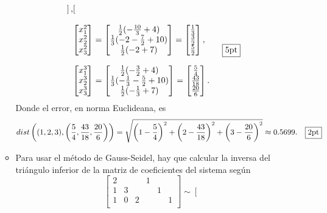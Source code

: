 \documentclass[11pt]{article}
\begin{document}
\begin{enumerate}
\begin{itemize}
$$\begin{array}{l}
\begin{bmatrix}
\end{bmatrix},\\ \\
\begin{bmatrix}
x_1^{2}\\x_2^{2}\\x_3^{2}
\end{bmatrix}
=
\begin{bmatrix}
\frac{1}{2}(-\frac{10}{3} +4)\\
\frac{1}{3}(-2-\frac{7}{2}+10)\\
\frac{1}{2}(-2+7)
\end{bmatrix}
=
\begin{bmatrix}
\frac{1}{3} \\ \frac{3}{2} \\ \frac{5}{2}
\end{bmatrix}, \\ \\
\begin{bmatrix}
x_1^{3}\\x_2^{3}\\x_3^{3}
\end{bmatrix}
=
\begin{bmatrix}
\frac{1}{2}(-\frac{3}{2} +4)\\
\frac{1}{3}(-\frac{1}{3}-\frac{5}{2}+10)\\
\frac{1}{2}(-\frac{1}{3}+7)
\end{bmatrix}
=
\begin{bmatrix}
\frac{5}{4} \\ \frac{43}{18} \\ \frac{20}{6}
\end{bmatrix}.
\end{array}\quad\fbox{5pt}
$$
Donde el error, en norma Euclideana, es 
$$
dist\left((1,2,3),\left(\frac{5}{4},\frac{43}{18},\frac{20}{6}\right)\right)=
\sqrt{	 \left(1-\frac{5 }{4 }\right)^2
		+\left(2-\frac{43}{18}\right)^2
		+\left(3-\frac{20}{6 }\right)^2}
        \approx
        0.5699. \quad\fbox{2pt}
$$
\item Para usar el m\'etodo de Gauss-Seidel, hay que calcular la inversa del tri\'angulo inferior de la matriz de coeficientes del sistema seg\'un
$$\left[\begin{array}{ccc|ccc}
2 &		&	&	1& 	&	\\
1 &	3	&	&	& 1	&	\\
1 &	0	&	2&	& 	&1	\\
\end{array}\right]
\sim
\left[\begin{array}{ccc|ccc}

\end{array}$$
\end{itemize}
\end{enumerate}
\end{document}
